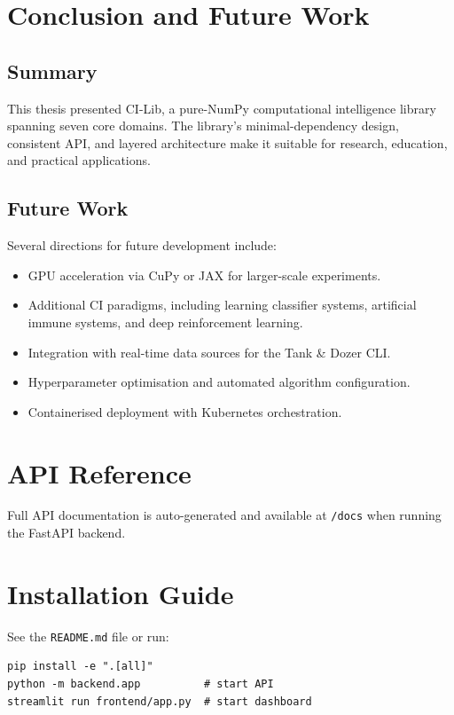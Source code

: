 \documentclass[12pt,a4paper,twoside]{report}
\begin{document}
\chapter{Conclusion and Future Work}
\label{chap:conclusion}

\section{Summary}
This thesis presented CI-Lib, a pure-NumPy computational intelligence
library spanning seven core domains. The library's minimal-dependency
design, consistent API, and layered architecture make it suitable for
research, education, and practical applications.

\section{Future Work}
Several directions for future development include:
\begin{itemize}
  \item GPU acceleration via CuPy or JAX for larger-scale experiments.
  \item Additional CI paradigms, including learning classifier systems,
        artificial immune systems, and deep reinforcement learning.
  \item Integration with real-time data sources for the Tank \& Dozer CLI.
  \item Hyperparameter optimisation and automated algorithm configuration.
  \item Containerised deployment with Kubernetes orchestration.
\end{itemize}




\appendix
\chapter{API Reference}
\label{app:api}
Full API documentation is auto-generated and available at \texttt{/docs}
when running the FastAPI backend.

\chapter{Installation Guide}
\label{app:installation}
See the \texttt{README.md} file or run:
\begin{lstlisting}
pip install -e ".[all]"
python -m backend.app          # start API
streamlit run frontend/app.py  # start dashboard
\end{lstlisting}
\end{document}
